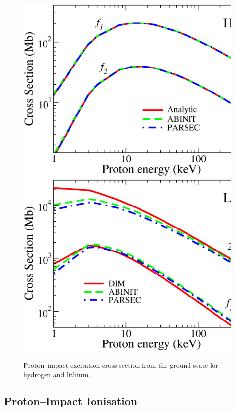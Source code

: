 \documentclass[10pt]{article}
\begin{document}
\begin{figure}[H]
\centering
 \includegraphics[height=0.23\textheight]{figures/pseudopot/Hex.eps}
 \hspace{0.4cm}
 \includegraphics[height=0.23\textheight]{figures/pseudopot/Liex.eps}
 \caption{Proton--impact excitation cross section from the ground 
 state for hydrogen and lithium.}
 \label{fig:exHLi}
\end{figure}


\subsection{Proton--Impact Ionisation}
\end{document}
